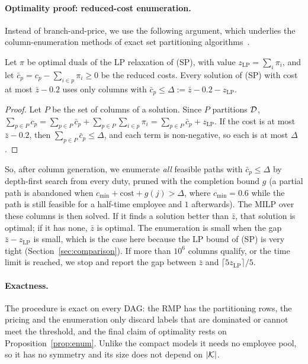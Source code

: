 \paragraph{Optimality proof: reduced-cost enumeration.} Instead of
branch-and-price, we use the following argument, which underlies the
column-enumeration methods of exact set partitioning
algorithms~\cite{baldacci2008}.

\begin{proposition}\label{prop:enum}
Let $\pi$ be optimal duals of the LP relaxation of (SP), with value
$z_{\mathrm{LP}}=\sum_i\pi_i$, and let $\bar c_p=c_p-\sum_{i\in p}\pi_i\ge0$
be the reduced costs. Every solution of (SP) with cost at most $\bar z-0.2$
uses only columns with $\bar c_p\le\Delta:=\bar z-0.2-z_{\mathrm{LP}}$.
\end{proposition}
\begin{proof}
Let $P$ be the set of columns of a solution. Since $P$ partitions $\mathcal{D}$,
$\sum_{p\in P}c_p=\sum_{p\in P}\bar c_p+\sum_{p\in P}\sum_{i\in p}\pi_i
=\sum_{p\in P}\bar c_p+z_{\mathrm{LP}}$. If the cost is at most $\bar z-0.2$,
then $\sum_{p\in P}\bar c_p\le\Delta$, and each term is non-negative, so each
is at most $\Delta$.
\end{proof}

So, after column generation, we enumerate \emph{all} feasible paths with
$\bar c_p\le\Delta$ by depth-first search from every duty, pruned with the
completion bound $g$ (a partial path is abandoned when
$c_{\min}+\text{cost}+g(j)>\Delta$, where $c_{\min}=0.6$ while the path is
still feasible for a half-time employee and $1$ afterwards). The MILP over
these columns is then solved. If it finds a solution better than $\bar z$,
that solution is optimal; if it has none, $\bar z$ is optimal. The
enumeration is small when the gap $\bar z-z_{\mathrm{LP}}$ is small, which is
the case here because the LP bound of (SP) is very tight
(Section~\ref{sec:comparison}). If more than $10^6$ columns qualify, or the
time limit is reached, we stop and report the gap between $\bar z$ and
$\lceil 5z_{\mathrm{LP}}\rceil/5$.

\paragraph{Exactness.} The procedure is exact on every DAG: the RMP has the
partitioning rows, the pricing and the enumeration only discard labels that
are dominated or cannot meet the threshold, and the final claim of
optimality rests on Proposition~\ref{prop:enum}. Unlike the compact models it
needs no employee pool, so it has no symmetry and its size does not depend on
$|\mathcal{K}|$.


